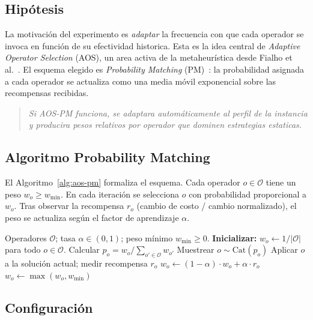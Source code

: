 \documentclass[11pt,a4paper]{article}
\theoremstyle{definition}
\theoremstyle{remark}
\begin{document}
\subsection{Hipótesis}

La motivación del experimento es \emph{adaptar} la frecuencia con que
cada operador se invoca en función de su efectividad historica. Esta es
la idea central de \emph{Adaptive Operator Selection} (AOS), un area
activa de la metaheurística desde Fialho et al.~\cite{fialho2008}. El esquema
elegido es \emph{Probability Matching} (PM)~\cite{thierens2005}: la probabilidad asignada a
cada operador se actualiza como una media móvil exponencial sobre las
recompensas recibidas.

\begin{quote}
\textit{Si AOS-PM funciona, se adaptara automáticamente al perfil de la
instancia y producira pesos relativos por operador que dominen
estrategias estaticas.}
\end{quote}

\subsection{Algoritmo Probability Matching}

El Algoritmo~\ref{alg:aos-pm} formaliza el esquema. Cada operador
$o \in \mathcal{O}$ tiene un peso $w_o \ge w_{\min}$. En cada iteración
se selecciona $o$ con probabilidad proporcional a $w_o$. Tras observar
la recompensa $r_o$ (cambio de costo / cambio normalizado), el peso se
actualiza según el factor de aprendizaje $\alpha$.

\begin{algorithm}[h]
\caption{AOS Probability Matching.}
\label{alg:aos-pm}
\begin{algorithmic}[1]
\Require Operadores $\mathcal{O}$; tasa $\alpha \in (0,1)$; peso mínimo $w_{\min} \ge 0$.
\State \textbf{Inicializar:} $w_o \gets 1 / |\mathcal{O}|$ para todo $o \in \mathcal{O}$.
  \State Calcular $p_o = w_o / \sum_{o' \in \mathcal{O}} w_{o'}$
  \State Muestrear $o \sim \text{Cat}(p_o)$
  \State Aplicar $o$ a la solución actual; medir recompensa $r_o$
  \State $w_o \gets (1-\alpha) \cdot w_o + \alpha \cdot r_o$
  \State $w_o \gets \max(w_o, w_{\min})$ 
\EndFor
\end{algorithmic}
\end{algorithm}

\subsection{Configuración}
\end{document}
